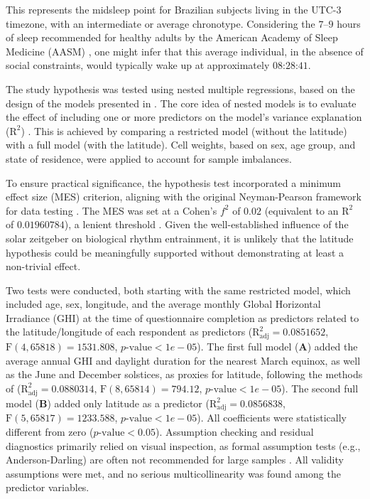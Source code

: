 \documentclass[
12pt,
openright,
oneside,
a4paper,
chapter=TITLE,
section=TITLE,
french,
spanish,
brazil,
english
]{abntex2}
\begin{document}
This represents the midsleep point for Brazilian subjects living in the
UTC-3 timezone, with an intermediate or average chronotype. Considering
the \(7–9\) hours of sleep recommended for healthy adults by the
American Academy of Sleep Medicine (AASM) \autocite{watson2015b}, one
might infer that this average individual, in the absence of social
constraints, would typically wake up at approximately
\(\text{08:28:41}\).

The study hypothesis was tested using nested multiple regressions, based
on the design of the models presented in \textcite{leocadio-miguel2017}.
The core idea of nested models is to evaluate the effect of including
one or more predictors on the model's variance explanation
(\(\text{R}^2\)) \autocite{maxwell2018}. This is achieved by comparing a
restricted model (without the latitude) with a full model (with the
latitude). Cell weights, based on sex, age group, and state of
residence, were applied to account for sample imbalances.

To ensure practical significance, the hypothesis test incorporated a
minimum effect size (MES) criterion, aligning with the original
Neyman-Pearson framework for data testing
\autocite{neyman1928,neyman1928a,perezgonzalez2015}. The MES was set at
a Cohen's \(f^2\) of \(0.02\) (equivalent to an \(\text{R}^2\) of
\(0.01960784\)), a lenient threshold \autocite{cohen1988a}. Given the
well-established influence of the solar zeitgeber on biological rhythm
entrainment, it is unlikely that the latitude hypothesis could be
meaningfully supported without demonstrating at least a non-trivial
effect.

Two tests were conducted, both starting with the same restricted model,
which included age, sex, longitude, and the average monthly Global
Horizontal Irradiance (GHI) at the time of questionnaire completion as
predictors related to the latitude/longitude of each respondent as
predictors (\(\text{R}^2_{\text{adj}} = 0.0851652\),
\(\text{F}(4, 65818) = 1531.808\), \(p\text{-value} < 1e-05\)). The
first full model (\textbf{A}) added the average annual GHI and daylight
duration for the nearest March equinox, as well as the June and December
solstices, as proxies for latitude, following the methods of
\textcite{leocadio-miguel2017} (\(\text{R}^2_{\text{adj}} = 0.0880314\),
\(\text{F}(8, 65814) = 794.12\), \(p\text{-value} < 1e-05\)). The second
full model (\textbf{B}) added only latitude as a predictor
(\(\text{R}^2_{\text{adj}} = 0.0856838\),
\(\text{F}(5, 65817) = 1233.588\), \(p\text{-value} < 1e-05\)). All
coefficients were statistically different from zero
(\(p\text{-value} < 0.05\)). Assumption checking and residual
diagnostics primarily relied on visual inspection, as formal assumption
tests (e.g., Anderson-Darling) are often not recommended for large
samples \autocite{shatz2024}. All validity assumptions were met, and no
serious multicollinearity was found among the predictor variables.
\end{document}
